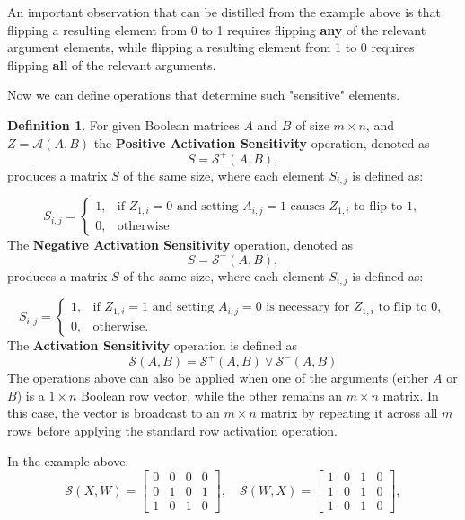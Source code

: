 \documentclass{article}
\theoremstyle{definition}
\newtheorem*{definition}{Definition}
\begin{document}
An important observation that can be distilled from the example above is that flipping a resulting element from 0 to 1 requires flipping \textbf{any} of the relevant argument elements, while flipping a resulting element from 1 to 0 requires flipping \textbf{all} of the relevant arguments.

Now we can define operations that determine such "sensitive" elements.

\begin{definition}
    For given Boolean matrices \( A \) and \( B \) of size \( m \times n \), and \( Z = \mathcal{A}(A, B) \) the \textbf{Positive Activation Sensitivity} operation, denoted as
    \[
        S = \mathcal{S}^+(A, B),
    \]
    produces a matrix \( S \) of the same size, where each element \( S_{i,j} \) is defined as:

    \[
        S_{i,j} =
        \begin{cases}
            1, & \text{if } Z_{1,i} = 0 \text{ and setting } A_{i,j} = 1 \text{ causes } Z_{1,i} \text{ to flip to } 1, \\
            0, & \text{otherwise}.
        \end{cases}
    \]
    The \textbf{Negative Activation Sensitivity} operation, denoted as
    \[
        S = \mathcal{S}^-(A, B),
    \]
    produces a matrix \( S \) of the same size, where each element \( S_{i,j} \) is defined as:

    \[
        S_{i,j} =
        \begin{cases}
            1, & \text{if } Z_{1,i} = 1 \text{ and setting } A_{i,j} = 0 \text{ is necessary for } Z_{1,i} \text{ to flip to }  0, \\
            0, & \text{otherwise}.
        \end{cases}
    \]
    The \textbf{Activation Sensitivity} operation is defined as
    \[
        \mathcal{S}(A, B) = \mathcal{S}^+(A, B) \vee \mathcal{S}^-(A, B)
    \]
    The operations above can also be applied when one of the arguments (either \( A \) or \( B \)) is a \( 1 \times n \) Boolean row vector, while the other remains an \( m \times n \) matrix. In this case, the vector is broadcast to an \( m \times n \) matrix by repeating it across all \( m \) rows before applying the standard row activation operation.
\end{definition}

In the example above:
\[
    \mathcal{S}(X, W) = \begin{bmatrix} 0 & 0 & 0 & 0 \\ 0 & 1 & 0 & 1 \\ 1 & 0 & 1 & 0 \end{bmatrix},\quad
    \mathcal{S}(W, X) = \begin{bmatrix} 1 & 0 & 1 & 0 \\ 1 & 0 & 1 & 0 \\ 1 & 0 & 1 & 0 \end{bmatrix},
\]
\end{document}

